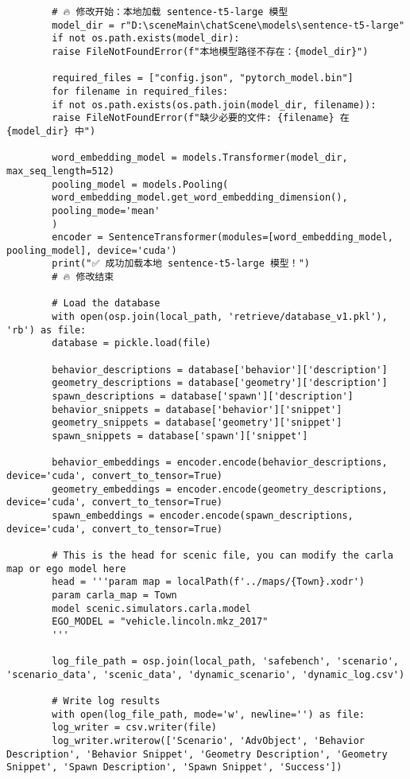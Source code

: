 \begin{enumerate}
\begin{verbatim}
		# 🔥 修改开始：本地加载 sentence-t5-large 模型
		model_dir = r"D:\sceneMain\chatScene\models\sentence-t5-large"
		if not os.path.exists(model_dir):
		raise FileNotFoundError(f"本地模型路径不存在：{model_dir}")
		
		required_files = ["config.json", "pytorch_model.bin"]
		for filename in required_files:
		if not os.path.exists(os.path.join(model_dir, filename)):
		raise FileNotFoundError(f"缺少必要的文件: {filename} 在 {model_dir} 中")
		
		word_embedding_model = models.Transformer(model_dir, max_seq_length=512)
		pooling_model = models.Pooling(
		word_embedding_model.get_word_embedding_dimension(),
		pooling_mode='mean'
		)
		encoder = SentenceTransformer(modules=[word_embedding_model, pooling_model], device='cuda')
		print("✅ 成功加载本地 sentence-t5-large 模型！")
		# 🔥 修改结束
		
		# Load the database
		with open(osp.join(local_path, 'retrieve/database_v1.pkl'), 'rb') as file:
		database = pickle.load(file)
		
		behavior_descriptions = database['behavior']['description']
		geometry_descriptions = database['geometry']['description']
		spawn_descriptions = database['spawn']['description']
		behavior_snippets = database['behavior']['snippet']
		geometry_snippets = database['geometry']['snippet']
		spawn_snippets = database['spawn']['snippet']
		
		behavior_embeddings = encoder.encode(behavior_descriptions, device='cuda', convert_to_tensor=True)
		geometry_embeddings = encoder.encode(geometry_descriptions, device='cuda', convert_to_tensor=True)
		spawn_embeddings = encoder.encode(spawn_descriptions, device='cuda', convert_to_tensor=True)
		
		# This is the head for scenic file, you can modify the carla map or ego model here
		head = '''param map = localPath(f'../maps/{Town}.xodr') 
		param carla_map = Town
		model scenic.simulators.carla.model
		EGO_MODEL = "vehicle.lincoln.mkz_2017"
		'''
		
		log_file_path = osp.join(local_path, 'safebench', 'scenario', 'scenario_data', 'scenic_data', 'dynamic_scenario', 'dynamic_log.csv')
		
		# Write log results
		with open(log_file_path, mode='w', newline='') as file:
		log_writer = csv.writer(file)
		log_writer.writerow(['Scenario', 'AdvObject', 'Behavior Description', 'Behavior Snippet', 'Geometry Description', 'Geometry Snippet', 'Spawn Description', 'Spawn Snippet', 'Success'])
		

\end{verbatim}
\end{enumerate}
